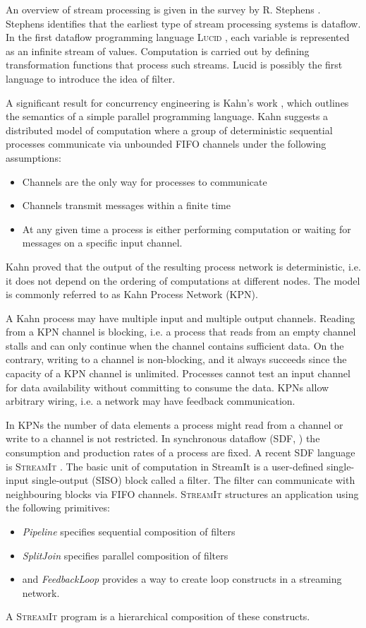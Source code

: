 An overview of stream processing is given in the survey by R. Stephens \cite{stephens97}. Stephens identifies that the earliest type of stream processing systems is dataflow. In the first dataflow programming language \textsc{Lucid} \cite{lucid}, each variable is represented as an infinite stream of values. Computation is carried out by defining transformation functions that process such streams. Lucid is possibly the first language to introduce the idea of filter.

A significant result for concurrency engineering is Kahn's work \cite{kahn74}, which outlines the semantics of a simple parallel programming language. Kahn suggests a distributed model of computation where a group of deterministic sequential processes communicate via unbounded FIFO channels under the following assumptions:
\begin{itemize}
\item Channels are the only way for processes to communicate
\item Channels transmit messages within a finite time
\item At any given time a process is either performing computation or waiting for messages on a specific input channel.
\end{itemize}
Kahn proved that the output of the resulting process network is deterministic, i.e. it does not depend on the ordering of computations at different nodes. The model is commonly referred to as Kahn Process Network (KPN).

A Kahn process may have multiple input and multiple output channels. Reading from a KPN channel is blocking, i.e. a process that reads from an empty channel stalls and can only continue when the channel contains sufficient data.  On the contrary, writing to a channel is non-blocking, and it always succeeds since the capacity of a KPN channel is unlimited. Processes cannot test an input channel for data availability without committing to consume the data. KPNs allow arbitrary wiring, i.e. a network may have feedback communication.

In KPNs the number of data elements a process might read from a channel or write to a channel is not restricted. In synchronous dataflow (SDF, \cite{sdf}) the consumption and production rates of a process are fixed. A recent SDF language is \textsc{StreamIt} \cite{streamit}. The basic unit of computation in StreamIt is a user-defined single-input single-output (SISO) block called a filter. The filter can communicate with neighbouring blocks via FIFO channels. \textsc{StreamIt} structures an application using the following primitives:
\begin{itemize}
\item \emph{Pipeline} specifies sequential composition of filters
\item \emph{SplitJoin} specifies parallel composition of filters
\item and \emph{FeedbackLoop} provides a way to create loop constructs in a streaming network.
\end{itemize}
A \textsc{StreamIt} program is a hierarchical composition of these constructs.

